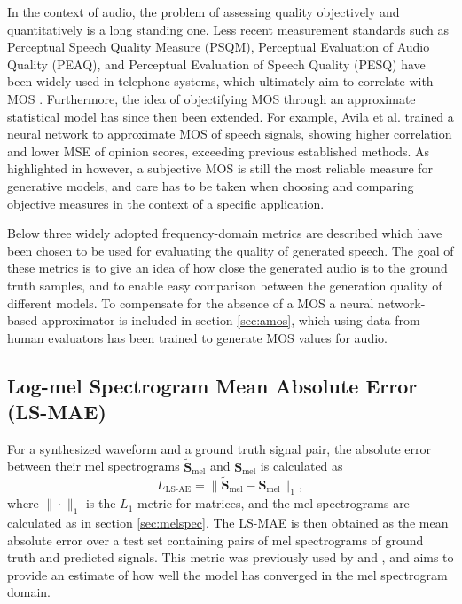 \documentclass{report}
\begin{document}
In the context of audio, the problem of assessing quality objectively and quantitatively is a long standing one. Less recent measurement standards such as Perceptual Speech Quality Measure (PSQM), Perceptual Evaluation of Audio Quality (PEAQ), and Perceptual Evaluation of Speech Quality (PESQ) have been widely used in telephone systems, which ultimately aim to correlate with MOS \cite{rix2001perceptual}. Furthermore, the idea of objectifying MOS through an approximate statistical model has since then been extended. For example, Avila et al. \cite{avila2019non} trained a neural network to approximate MOS of speech signals, showing higher correlation and lower MSE of opinion scores, exceeding previous established methods. As highlighted in \cite{theis2015note} however, a subjective MOS is still the most reliable measure for generative models, and care has to be taken when choosing and comparing objective measures in the context of a specific application.

Below three widely adopted frequency-domain metrics are described which have been chosen to be used for evaluating the quality of generated speech. The goal of these metrics is to give an idea of how close the generated audio is to the ground truth samples, and to enable easy comparison between the generation quality of different models. To compensate for the absence of a MOS a neural network-based approximator is included in section \ref{sec:amos}, which using data from human evaluators has been trained to generate MOS values for audio.


\subsection{Log-mel Spectrogram Mean Absolute Error (LS-MAE)}

For a synthesized waveform and a ground truth signal pair, the absolute error between their mel spectrograms $\tilde{\bm{S}}_{\text{mel}}$ and $\bm{S}_{\text{mel}}$ is calculated as
\begin{equation}
    L_{\text{LS-AE}} = \| \tilde{\bm{S}}_{\text{mel}} - \bm{S}_{\text{mel}} \|_1,
\end{equation}
where $\|\cdot \|_1$ is the $L_1$ metric for matrices, and the mel spectrograms are calculated as in section \ref{sec:melspec}. The LS-MAE is then obtained as the mean absolute error over a test set containing pairs of mel spectrograms of ground truth and predicted signals. This metric was previously used by \cite{kong2020hifi} and \cite{lee2021priorgrad}, and aims to provide an estimate of how well the model has converged in the mel spectrogram domain.
\end{document}

